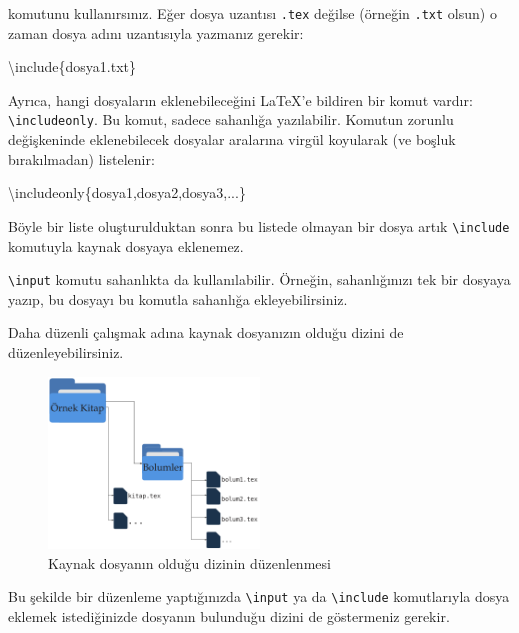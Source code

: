 \documentclass[
  10pt,
]{scrbook}
\newenvironment{Shaded}{}{}
\newcommand{\BuiltInTok}[1]{#1}
\newcommand{\ExtensionTok}[1]{#1}
\newcommand{\FunctionTok}[1]{\textcolor[rgb]{0.02,0.16,0.49}{#1}}
\newcommand{\NormalTok}[1]{#1}
\theoremstyle{definition}
\theoremstyle{definition}
\theoremstyle{definition}
\theoremstyle{definition}
\theoremstyle{remark}
\begin{document}
komutunu kullanırsınız. Eğer dosya uzantısı \texttt{.tex} değilse (örneğin \texttt{.txt} olsun) o zaman dosya adını uzantısıyla yazmanız gerekir:

\begin{Shaded}
\begin{Highlighting}[]
\BuiltInTok{\textbackslash{}include}\NormalTok{\{}\ExtensionTok{dosya1.txt}\NormalTok{\}}
\end{Highlighting}
\end{Shaded}

Ayrıca, hangi dosyaların eklenebileceğini LaTeX'e bildiren bir komut vardır: \texttt{\textbackslash{}includeonly}. Bu komut, sadece sahanlığa yazılabilir. Komutun zorunlu değişkeninde eklenebilecek dosyalar aralarına virgül koyularak (ve boşluk bırakılmadan) listelenir:

\begin{Shaded}
\begin{Highlighting}[]
\FunctionTok{\textbackslash{}includeonly}\NormalTok{\{dosya1,dosya2,dosya3,...\}}
\end{Highlighting}
\end{Shaded}

Böyle bir liste oluşturulduktan sonra bu listede olmayan bir dosya artık \texttt{\textbackslash{}include} komutuyla kaynak dosyaya eklenemez.

\texttt{\textbackslash{}input} komutu sahanlıkta da kullanılabilir. Örneğin, sahanlığınızı tek bir dosyaya yazıp, bu dosyayı bu komutla sahanlığa ekleyebilirsiniz.

Daha düzenli çalışmak adına kaynak dosyanızın olduğu dizini de düzenleyebilirsiniz.

\begin{figure}
\centering
\includegraphics[width=0.5\textwidth,height=\textheight]{images/dizin.png}
\caption{Kaynak dosyanın olduğu dizinin düzenlenmesi}
\end{figure}

Bu şekilde bir düzenleme yaptığınızda \texttt{\textbackslash{}input} ya da \texttt{\textbackslash{}include} komutlarıyla dosya eklemek istediğinizde dosyanın bulunduğu dizini de göstermeniz gerekir.
\end{document}
